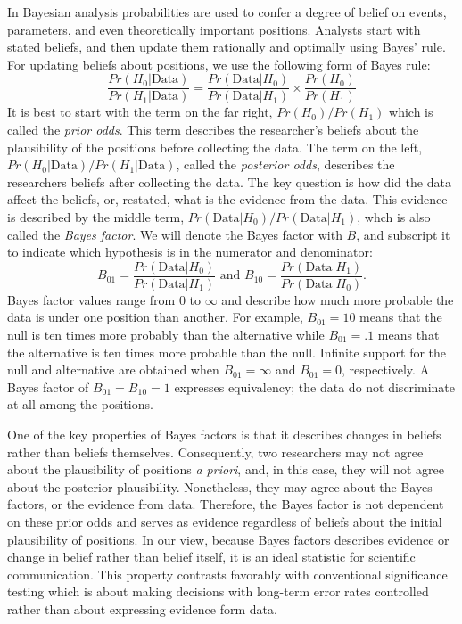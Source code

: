 \documentclass[fignum,nobf,man]{apa}
\begin{document}
\nocite{Laplace:1986,Morey:Rouder:2014}

In Bayesian analysis probabilities are used to confer a degree of belief on events, parameters, and even theoretically important positions.  Analysts start with stated beliefs, and then update them rationally and optimally using Bayes' rule.  For updating beliefs about positions, we use the following form of Bayes rule:
\begin{equation}
\frac{Pr(H_0 | \mbox{Data})}{Pr(H_1 | \mbox{Data})} = \frac{Pr(\mbox{Data} | H_0)}{Pr(\mbox{Data} | H_1)} \times \frac{Pr(H_0)}{Pr (H_1)} 
\end{equation}
It is best to start with the term on the far right, $Pr(H_0)/Pr(H_1)$ which is called the {\em prior odds}.  This term describes the researcher's beliefs about the plausibility of the positions before collecting the data.  The term on the left, $Pr(H_0 | \mbox{Data})/Pr(H_1 | \mbox{Data})$, called the {\em posterior odds}, describes the researchers beliefs after collecting the data.   The key question is how did the data affect the beliefs, or, restated, what is the evidence from the data.  This evidence is described by the middle term,  $Pr(\mbox{Data} | H_0)/Pr(\mbox{Data} | H_1)$, whch is also called the {\em Bayes factor}.  We will denote the Bayes factor with $B$, and subscript it to indicate which hypothesis is in the numerator and denominator:
\[
B_{01} = \frac{Pr(\mbox{Data} | H_0)}{Pr(\mbox{Data} | H_1)} \mbox{ and } B_{10} = \frac{Pr(\mbox{Data} | H_1)}{Pr(\mbox{Data} | H_0)}.
\]
Bayes factor values range from 0 to $\infty$ and describe how much more probable the data is under one position than another.  For example, $B_{01}=10$ means that the null is ten times more probably than the alternative while $B_{01}=.1$ means that the alternative is ten times more probable than the null.  Infinite support for the null and alternative are obtained when $B_{01}=\infty$ and $B_{01}=0$, respectively.  A Bayes factor of $B_{01}=B_{10}=1$ expresses equivalency; the data do not discriminate at all among the positions.

One of the key properties of Bayes factors is that it describes changes in beliefs rather than beliefs themselves.  Consequently, two researchers may not agree about the plausibility of positions {\em a priori}, and, in this case, they will not agree about the posterior plausibility.  Nonetheless, they may agree about the Bayes factors, or the evidence from data.  Therefore, the Bayes factor is not dependent on these prior odds and serves as evidence regardless of beliefs about the initial plausibility of positions.  In our view, because Bayes factors describes evidence or change in belief rather than belief itself, it is an ideal statistic for scientific communication.  This property contrasts favorably with conventional significance testing which is about making decisions with long-term error rates controlled rather than about expressing evidence form data. 
\end{document}
